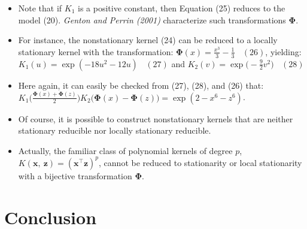 \documentclass[
  ignorenonframetext,
]{beamer}
\begin{document}
\begin{frame}{}
\protect\hypertarget{section-16}{}
\begin{itemize}
\item
  Note that if \(K_1\) is a positive constant, then Equation (25)
  reduces to the model (20). \emph{Genton and Perrin (2001)}
  characterize such transformations \(\pmb \Phi\).
\item
  For instance, the nonstationary kernel (24) can be reduced to a
  locally stationary kernel with the transformation:
  \(\pmb\Phi(x) = \frac {x^3} 3 - \frac 1 3 \ \ \ \ (26)\), yielding:
  \(K_1(u) = \exp(-18u^2 - 12u) \ \ \ \ (27)\) and
  \(K_2(v) = \exp \big(-\frac 9 2 v^2\big) \ \ \ \ (28)\)
\end{itemize}
\end{frame}

\begin{frame}{}
\protect\hypertarget{section-17}{}
\begin{itemize}
\item
  Here again, it can easily be checked from (27), (28), and (26) that:
  \(K_1\Big(\frac {\pmb\Phi(x) + \pmb\Phi(z)} 2 \Big)K_2\big(\pmb\Phi(x)-\pmb\Phi(z)\big)=\exp(2-x^6-z^6)\).
\item
  Of course, it is possible to construct nonstationary kernels that are
  neither stationary reducible nor locally stationary reducible.
\item
  Actually, the familiar class of polynomial kernels of degree \(p\),
  \(K(\pmb x,\ \pmb z) = (\pmb x^{\top}\pmb z)^p\), cannot be reduced to
  stationarity or local stationarity with a bijective transformation
  \(\pmb \Phi\).
\end{itemize}
\end{frame}

\hypertarget{conclusion}{%
\section{Conclusion}\label{conclusion}}
\end{document}
